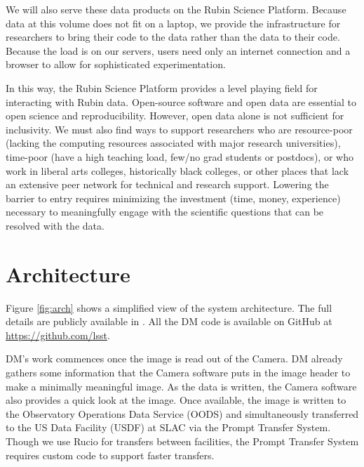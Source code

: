 \documentclass[11pt,twoside]{article}
\begin{document}
We will also serve these data products on the Rubin Science Platform.
Because data at this volume does not fit on a laptop, we provide the infrastructure for researchers to bring their code to the data rather than the data to their code.
Because the load is on our servers, users need only an internet connection and a browser to allow for sophisticated experimentation.

In this way, the Rubin Science Platform provides a level playing field for interacting with Rubin data.
Open-source software and open data are essential to open science and reproducibility. However, open data alone is not sufficient for inclusivity.
We must also find ways to support researchers who are resource-poor (lacking the computing resources associated with major research universities), time-poor (have a high teaching load, few/no grad students or postdocs), or who work in liberal arts colleges, historically black colleges, or other places that lack an extensive peer network for technical and research support.
Lowering the barrier to entry requires minimizing the investment (time, money, experience) necessary to meaningfully engage with the scientific questions that can be resolved with the data.

\section{Architecture}

Figure \ref{fig:arch} shows a simplified view of the system architecture. The full details are publicly available in \citep{LDM-148}. All the DM code is available on GitHub at \url{https://github.com/lsst}.

\begin{centering}
\end{centering}

DM's work commences once the image is read out of the Camera. DM already gathers some information that the Camera software puts in the image header to make a minimally meaningful image.
As the data is written, the Camera software also provides a quick look at the image.
Once available, the image is written to the Observatory Operations Data Service (OODS) and simultaneously transferred to the US Data Facility (USDF) at SLAC via the Prompt Transfer System. Though we use Rucio for transfers between facilities, the Prompt Transfer System requires custom code to support faster transfers.
\end{document}
